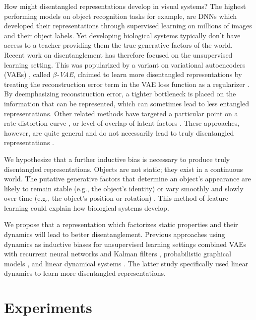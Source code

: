 \documentclass[10pt,letterpaper]{article}
\begin{document}
How might disentangled representations develop in visual systems? The highest performing models on object recognition tasks for example, are DNNs which developed their representations through supervised learning on millions of images and their object labels. Yet developing biological systems typically don't have access to a teacher providing them the true generative factors of the world. Recent work on disentanglement has therefore focused on the unsupervised learning setting. %
This was popularized by a variant on variational autoencoders (VAEs) \cite{Kingma2014}, called \textit{$\beta$-VAE}, claimed to learn more disentangled representations by treating the reconstruction error term in the VAE loss function as a regularizer \cite{Higgins2017}. By deemphasizing reconstruction error, a tighter bottleneck is placed on the information that can be represented, which can sometimes lead to less entangled representations. Other related methods have targeted a particular point on a rate-distortion curve \cite{Alemi2017}, or level of overlap of latent factors \cite{Mathieu2018}. These approaches, however, are quite general and do not necessarily lead to truly disentangled representations \cite{Alemi2017,Mathieu2018}.

We hypothesize that a further inductive bias is necessary to produce truly disentangled representations. Objects are not static; they exist in a continuous world. The putative generative factors that determine an object’s appearance are likely to remain stable (e.g., the object's identity) or vary smoothly and slowly over time (e.g., the object's position or rotation) \cite{Wiskott2002}. This method of feature learning could explain how biological systems develop.

We propose that a representation which factorizes static properties and their dynamics will lead to better disentanglement. Previous approaches using dynamics as inductive biases for unsupervised learning settings combined VAEs with recurrent neural networks and Kalman filters \cite{Krishnan2015}, probabilistic graphical models \cite{Karl2016,Johnson2016}, and linear dynamical systems \cite{Archer2016,Johnson2016,Watter2015,Fraccaro2017a}. The latter study specifically used linear dynamics to learn more disentangled representations.


\section{Experiments}



\bigskip



\setlength{\bibleftmargin}{.125in}
\setlength{\bibindent}{-\bibleftmargin}

\end{document}
